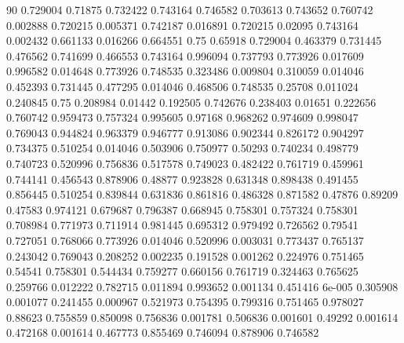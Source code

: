 90
0.729004 0.71875
0.732422 0.743164
0.746582 0.703613
0.743652 0.760742
0.002888 0.720215
0.005371 0.742187
0.016891 0.720215
0.02095 0.743164
0.002432 0.661133
0.016266 0.664551
0.75 0.65918
0.729004 0.463379
0.731445 0.476562
0.741699 0.466553
0.743164 0.996094
0.737793 0.773926
0.017609 0.996582
0.014648 0.773926
0.748535 0.323486
0.009804 0.310059
0.014046 0.452393
0.731445 0.477295
0.014046 0.468506
0.748535 0.25708
0.011024 0.240845
0.75 0.208984
0.01442 0.192505
0.742676 0.238403
0.01651 0.222656
0.760742 0.959473
0.757324 0.995605
0.97168 0.968262
0.974609 0.998047
0.769043 0.944824
0.963379 0.946777
0.913086 0.902344
0.826172 0.904297
0.734375 0.510254
0.014046 0.503906
0.750977 0.50293
0.740234 0.498779
0.740723 0.520996
0.756836 0.517578
0.749023 0.482422
0.761719 0.459961
0.744141 0.456543
0.878906 0.48877
0.923828 0.631348
0.898438 0.491455
0.856445 0.510254
0.839844 0.631836
0.861816 0.486328
0.871582 0.47876
0.89209 0.47583
0.974121 0.679687
0.796387 0.668945
0.758301 0.757324
0.758301 0.708984
0.771973 0.711914
0.981445 0.695312
0.979492 0.726562
0.79541 0.727051
0.768066 0.773926
0.014046 0.520996
0.003031 0.773437
0.765137 0.243042
0.769043 0.208252
0.002235 0.191528
0.001262 0.224976
0.751465 0.54541
0.758301 0.544434
0.759277 0.660156
0.761719 0.324463
0.765625 0.259766
0.012222 0.782715
0.011894 0.993652
0.001134 0.451416
6e-005 0.305908
0.001077 0.241455
0.000967 0.521973
0.754395 0.799316
0.751465 0.978027
0.88623 0.755859
0.850098 0.756836
0.001781 0.506836
0.001601 0.49292
0.001614 0.472168
0.001614 0.467773
0.855469 0.746094
0.878906 0.746582
